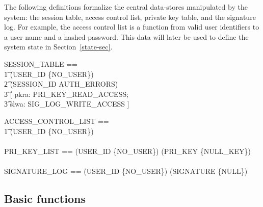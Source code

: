\documentclass[a4paper,pdftex]{article}
\begin{document}
The following definitions formalize the central data-stores manipulated
by the system: the session table, access control list, private key table,
and the signature log.  For example, the access control list is a function from valid user identifiers
to a user name and a hashed password.   This data will later be used to define
the system state in Section~\ref{state-sec}.

\begin{zed}
SESSION\_TABLE == \\
\t1 (USER\_ID  \setminus \{NO\_USER\}) \pfun \\
\t2   (SESSION\_ID \setminus AUTH\_ERRORS) \pfun \\
\t3     [ pkra: PRI\_KEY\_READ\_ACCESS; \\
\t3       slwa: SIG\_LOG\_WRITE\_ACCESS ]
\end{zed}
\begin{zed}
ACCESS\_CONTROL\_LIST == \\
\t1 (USER\_ID \setminus \{NO\_USER\}) \\
\\
PRI\_KEY\_LIST == (USER\_ID \setminus \{NO\_USER\}) \pfun (PRI\_KEY \setminus \{NULL\_KEY\}) \\
\\
SIGNATURE\_LOG == (USER\_ID \setminus \{NO\_USER\}) \pfun (SIGNATURE \setminus \{NULL\})
\end{zed}


\subsection{Basic functions}
\end{document}
